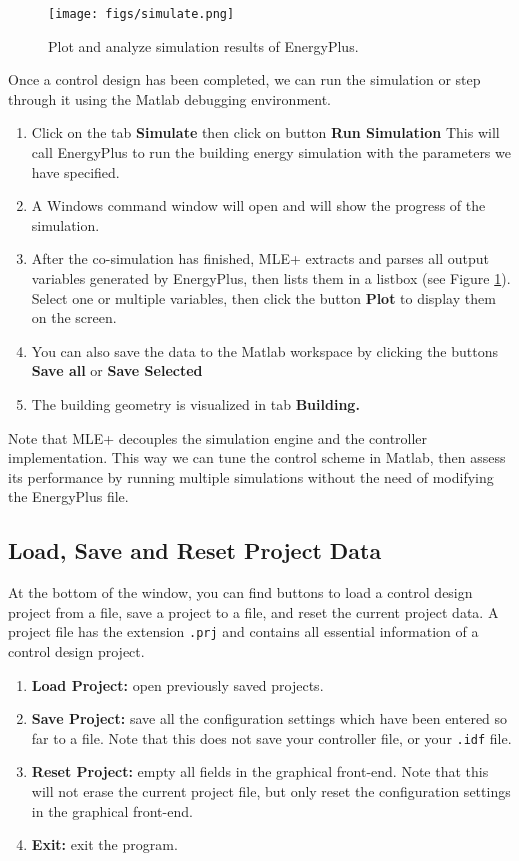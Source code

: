 \documentclass[11pt]{article}
\begin{document}
\begin{figure}[htb]
\centering
\texttt{[image: figs/simulate.png]}
\caption{\label{fig:simulate}Plot and analyze simulation results of EnergyPlus.}
\end{figure}



Once a control design has been completed, we can run the simulation or
step through it using the Matlab debugging environment.

\begin{enumerate}
\item Click on the tab \textbf{Simulate} then click on button \textbf{Run Simulation}
This will call EnergyPlus to run the building energy simulation
with the parameters we have specified.
\item A Windows command window will open and will show the progress of
the simulation.
\item After the co-simulation has finished, MLE+ extracts and parses all
output variables generated by EnergyPlus, then lists them in a
listbox (see Figure \ref{fig:simulate}).  Select one or multiple
variables, then click the button \textbf{Plot} to display them on the screen.
\item You can also save the data to the Matlab workspace by clicking the
buttons \textbf{Save all} or \textbf{Save Selected}
\item The building geometry is visualized in tab \textbf{Building.}
\end{enumerate}


Note that MLE+ decouples the simulation engine and the controller
implementation.  This way we can tune the control scheme in Matlab,
then assess its performance by running multiple simulations without
the need of modifying the EnergyPlus file.



\subsection{Load, Save and Reset Project Data}
\label{sec-4-7}

At the bottom of the window, you can find buttons to load a control
design project from a file, save a project to a file, and reset the
current project data.  A project file has the extension \texttt{.prj} and
contains all essential information of a control design project.

\begin{enumerate}
\item \textbf{Load Project:} open previously saved projects.
\item \textbf{Save Project:} save all the configuration settings which have been
entered so far to a file.  Note that this does not save your
controller file, or your \texttt{.idf} file.
\item \textbf{Reset Project:} empty all fields in the graphical front-end.  Note that this will
not erase the current project file, but only reset the
configuration settings in the graphical front-end.
\item \textbf{Exit:} exit the program.
\end{enumerate}
\end{document}
